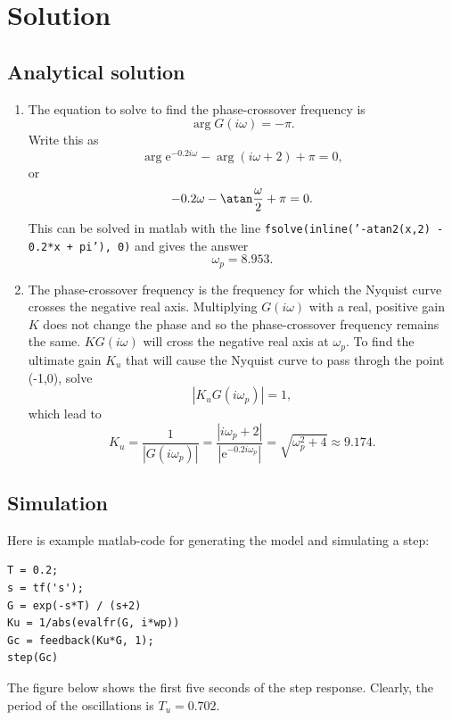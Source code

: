 \documentclass{scrartcl}
\newcommand*{\mexp}[1]{\ensuremath{\mathrm{e}^{#1}}}
\begin{document}
\section{Solution}
\label{sec-2}
\subsection{Analytical solution}
\label{sec-2-1}

\begin{enumerate}
\item The equation to solve to find the phase-crossover frequency is
      \[ \arg G(i\omega) = -\pi. \]
      Write this as
      \[ \arg \mexp{-0.2i\omega} - \arg (i\omega + 2) + \pi = 0, \]
      or 
      \[ -0.2\omega - \atan \frac{\omega}{2} + \pi = 0. \]
      This can be solved in matlab with the line
      \texttt{fsolve(inline('-atan2(x,2) - 0.2*x + pi'), 0)} and gives the answer
      \[\omega_p = 8.953. \]
\item The phase-crossover frequency is the frequency for which the Nyquist curve crosses the negative real axis. Multiplying $G(i\omega)$ with a real, positive gain $K$ does not change the phase and so the phase-crossover frequency remains the same. $KG(i\omega)$ will cross the negative real axis at $\omega_p$. To find the ultimate gain $K_u$ that will cause the Nyquist curve to pass throgh the point (-1,0), solve
      \[ |K_uG(i\omega_p)| = 1, \]
      which lead to
      \[ K_u = \frac{1}{|G(i\omega_p)|} = \frac{|i\omega_p + 2|}{|\mexp{-0.2i\omega_p}|} = \sqrt{\omega_p^2 + 4} \approx 9.174. \]
\end{enumerate}
   
\subsection{Simulation}
\label{sec-2-2}

   Here is example matlab-code for generating the model and simulating a step:

\begin{verbatim}
T = 0.2;
s = tf('s');
G = exp(-s*T) / (s+2)
Ku = 1/abs(evalfr(G, i*wp))
Gc = feedback(Ku*G, 1);
step(Gc)
\end{verbatim}
     The figure below shows the first five seconds of the step response. Clearly, the period of the oscillations is $T_u = 0.702$.
   
      \begin{center}
      
      \end{center}
\end{document}
